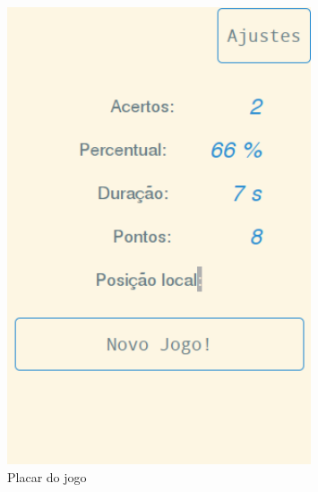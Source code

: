 \documentclass[
12pt,
a4paper,
portuges,
draft
]{report}
\begin{document}
\begin{figure}
    \centering
    \includegraphics[width=0.8\textwidth,natwidth=610,natheight=642]{score.png}
	\caption{Placar do jogo}
\end{figure}
\end{document}
